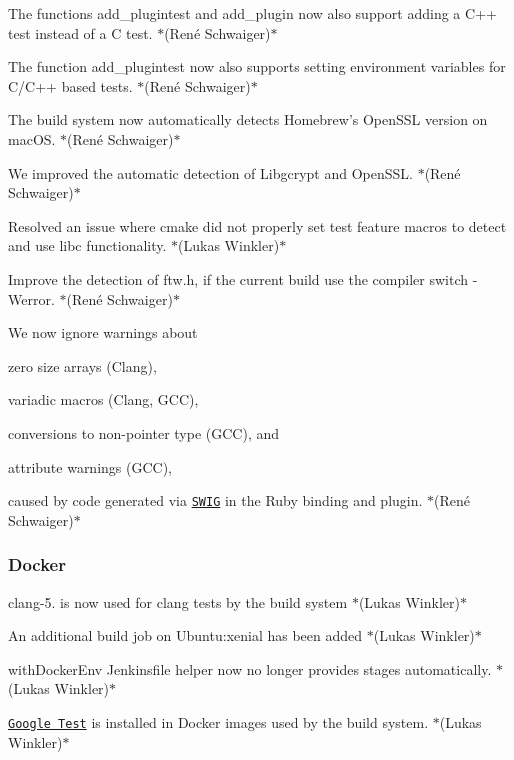 \begin{DoxyItemize}
\item The functions {\ttfamily add\+\_\+plugintest} and {\ttfamily add\+\_\+plugin} now also support adding a C++ test instead of a C test. $\ast$(René Schwaiger)$\ast$
\item The function {\ttfamily add\+\_\+plugintest} now also supports setting environment variables for C/\+C++ based tests. $\ast$(René Schwaiger)$\ast$
\item The build system now automatically detects Homebrew’s Open\+S\+SL version on mac\+OS. $\ast$(René Schwaiger)$\ast$
\item We improved the automatic detection of Libgcrypt and Open\+S\+SL. $\ast$(René Schwaiger)$\ast$
\item Resolved an issue where cmake did not properly set test feature macros to detect and use libc functionality. $\ast$(Lukas Winkler)$\ast$
\item Improve the detection of {\ttfamily ftw.\+h}, if the current build use the compiler switch {\ttfamily -\/\+Werror}. $\ast$(René Schwaiger)$\ast$
\item We now ignore warnings about
\begin{DoxyItemize}
\item zero size arrays (Clang),
\item variadic macros (Clang, G\+CC),
\item conversions to non-\/pointer type (G\+CC), and
\item attribute warnings (G\+CC),
\end{DoxyItemize}

caused by code generated via \href{http://www.swig.org}{\tt S\+W\+IG} in the Ruby binding and plugin. $\ast$(René Schwaiger)$\ast$
\end{DoxyItemize}

\subsubsection*{Docker}


\begin{DoxyItemize}
\item {\ttfamily clang-\/5.} is now used for clang tests by the build system $\ast$(Lukas Winkler)$\ast$
\item An additional build job on Ubuntu\+:xenial has been added $\ast$(Lukas Winkler)$\ast$
\item {\ttfamily with\+Docker\+Env} Jenkinsfile helper now no longer provides stages automatically. $\ast$(Lukas Winkler)$\ast$
\item \href{https://github.com/google/googletest}{\tt Google Test} is installed in Docker images used by the build system. $\ast$(Lukas Winkler)$\ast$
\end{DoxyItemize}

